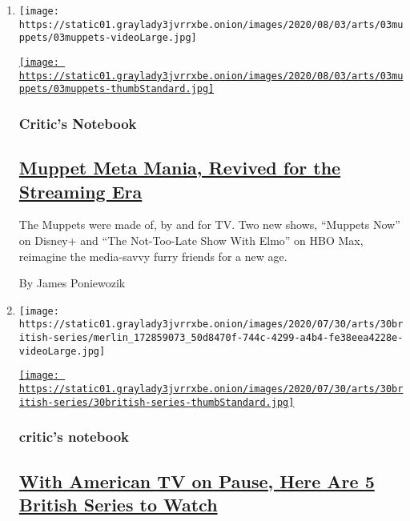 \begin{enumerate}
\def\labelenumi{\arabic{enumi}.}
\item
  \texttt{[image: https://static01.graylady3jvrrxbe.onion/images/2020/08/03/arts/03muppets/03muppets-videoLarge.jpg]}

  \href{/2020/07/31/arts/television/muppets-now.html}{\texttt{[image: https://static01.graylady3jvrrxbe.onion/images/2020/08/03/arts/03muppets/03muppets-thumbStandard.jpg]}}

  \hypertarget{critics-notebook}{%
  \subsubsection{Critic's Notebook}\label{critics-notebook}}

  \hypertarget{muppet-meta-mania-revived-for-the-streaming-era}{%
  \subsection{\texorpdfstring{\href{/2020/07/31/arts/television/muppets-now.html}{Muppet
  Meta Mania, Revived for the Streaming
  Era}}{Muppet Meta Mania, Revived for the Streaming Era}}\label{muppet-meta-mania-revived-for-the-streaming-era}}

  The Muppets were made of, by and for TV. Two new shows, ``Muppets
  Now'' on Disney+ and ``The Not-Too-Late Show With Elmo'' on HBO Max,
  reimagine the media-savvy furry friends for a new age.

  By James Poniewozik
\item
  \texttt{[image: https://static01.graylady3jvrrxbe.onion/images/2020/07/30/arts/30british-series/merlin\_172859073\_50d8470f-744c-4299-a4b4-fe38eea4228e-videoLarge.jpg]}

  \href{/2020/07/30/arts/television/in-my-skin-hulu.html}{\texttt{[image: https://static01.graylady3jvrrxbe.onion/images/2020/07/30/arts/30british-series/30british-series-thumbStandard.jpg]}}

  \hypertarget{critics-notebook-1}{%
  \subsubsection{critic's notebook}\label{critics-notebook-1}}

  \hypertarget{with-american-tv-on-pause-here-are-5-british-series-to-watch}{%
  \subsection{\texorpdfstring{\href{/2020/07/30/arts/television/in-my-skin-hulu.html}{With
  American TV on Pause, Here Are 5 British Series to
  Watch}}{With American TV on Pause, Here Are 5 British Series to Watch}}\label{with-american-tv-on-pause-here-are-5-british-series-to-watch}}


\end{enumerate}
